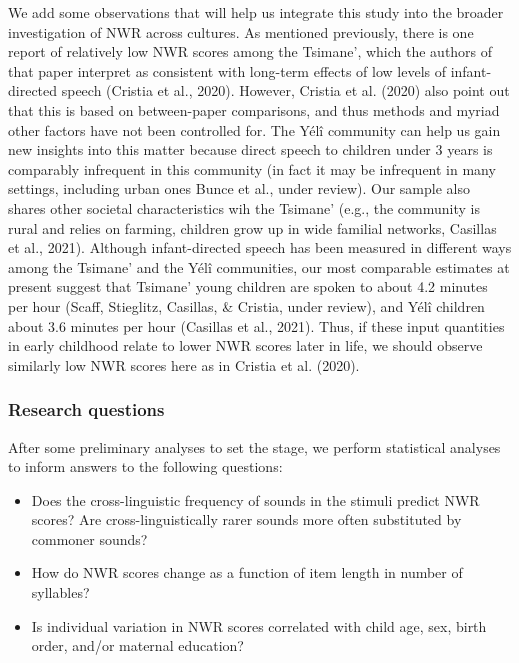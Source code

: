 \documentclass[
  american,
  ,man,floatsintext]{apa6}
\providecommand{\tightlist}{%
  \setlength{\itemsep}{0pt}\setlength{\parskip}{0pt}}
\begin{document}
We add some observations that will help us integrate this study into the broader investigation of NWR across cultures. As mentioned previously, there is one report of relatively low NWR scores among the Tsimane', which the authors of that paper interpret as consistent with long-term effects of low levels of infant-directed speech (Cristia et al., 2020). However, Cristia et al. (2020) also point out that this is based on between-paper comparisons, and thus methods and myriad other factors have not been controlled for. The Yélî community can help us gain new insights into this matter because direct speech to children under 3 years is comparably infrequent in this community (in fact it may be infrequent in many settings, including urban ones Bunce et al., under review). Our sample also shares other societal characteristics wih the Tsimane' (e.g., the community is rural and relies on farming, children grow up in wide familial networks, Casillas et al., 2021). Although infant-directed speech has been measured in different ways among the Tsimane' and the Yélî communities, our most comparable estimates at present suggest that Tsimane' young children are spoken to about 4.2 minutes per hour (Scaff, Stieglitz, Casillas, \& Cristia, under review), and Yélî children about 3.6 minutes per hour (Casillas et al., 2021). Thus, if these input quantities in early childhood relate to lower NWR scores later in life, we should observe similarly low NWR scores here as in Cristia et al. (2020).

\hypertarget{research-questions}{%
\subsubsection{Research questions}\label{research-questions}}

After some preliminary analyses to set the stage, we perform statistical analyses to inform answers to the following questions:

\begin{itemize}
\tightlist
\item
  Does the cross-linguistic frequency of sounds in the stimuli predict NWR scores? Are cross-linguistically rarer sounds more often substituted by commoner sounds?
\item
  How do NWR scores change as a function of item length in number of syllables?
\item
  Is individual variation in NWR scores correlated with child age, sex, birth order, and/or maternal education?
\end{itemize}
\end{document}
